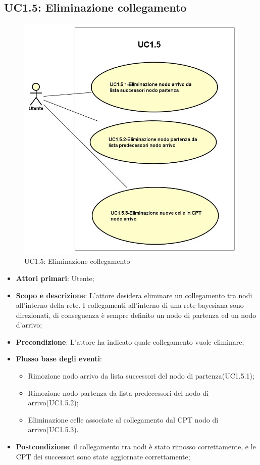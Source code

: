 \subsection{UC1.5: Eliminazione collegamento} 
\hypertarget{UC1.5}{} 
\begin{figure} [H]
	\centering
	\includegraphics[scale=0.45]{Img/UC1-5} 
	\caption{UC1.5: Eliminazione collegamento} \label{} 
\end{figure} 
\begin{itemize} 
	\item{\textbf{Attori primari}: Utente;} 
	\item{\textbf{Scopo e descrizione}: L'attore desidera eliminare un collegamento tra nodi all'interno della rete. I collegamenti all'interno di una rete bayesiana sono direzionati, di conseguenza è sempre definito un nodo di partenza ed un nodo d'arrivo;} 
	\item{\textbf{Precondizione}: L'attore ha indicato quale collegamento vuole eliminare;} 
	\item{\textbf{Flusso base degli eventi}: } 
	\begin{itemize} 
		\item{Rimozione nodo arrivo da lista successori del nodo di partenza(UC1.5.1);} 
		\item{Rimozione nodo partenza da lista predecessori del nodo di arrivo(UC1.5.2);} 
		\item{Eliminazione celle associate al collegamento dal CPT nodo di arrivo(UC1.5.3).} 
	\end{itemize} 
	\item{\textbf{Postcondizione}: il collegamento tra nodi è stato rimosso correttamente, e le CPT dei successori sono state aggiornate correttamente;} 
\end{itemize} 
